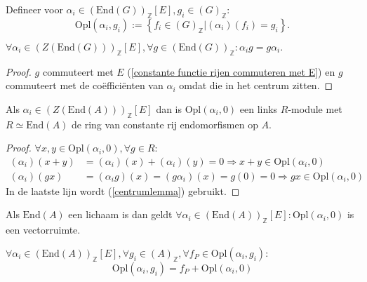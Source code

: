 \documentclass[a4paper,12pt]{article}
\begin{document}
\begin{definition} 
    Defineer voor $\alpha_i \in (\text{End}(G))_\mathbb{Z}[E], g_i \in (G)_{\mathbb{Z}}:$
    $$
        \text{Opl}(\alpha_i, g_i)  := \left\{f_i \in (G)_{\mathbb{Z}} | (\alpha_i)(f_i)=g_i \right\}.
    $$
\end{definition}

\begin{lemma}
    \label{centrumlemma}
    $\forall \alpha_i \in (Z(\text{End}(G)))_\mathbb{Z}[E], \forall g \in (\text{End}(G))_\mathbb{Z}: \alpha_ig = g\alpha_i.$
\end{lemma}

\begin{proof}
    $g$ commuteert met $E$ (\ref{constante functie rijen commuteren met E}) en $g$ commuteert met de coëfficiënten van
    $\alpha_i$ omdat die in het centrum zitten.
\end{proof}

\begin{theorem}
    Als $ \alpha_i \in (Z(\text{End}(A)))_\mathbb{Z}[E]$ dan is $\text{Opl}(\alpha_i,0)$ een links $R$-module
    met $R \simeq \text{End}(A)$ de ring van constante rij endomorfismen op $A$.
\end{theorem}

\begin{proof}
    $\forall x,y \in \text{Opl}(\alpha_i,0), \forall g \in R:$
    \begin{align*}
        (\alpha_i)(x+y) & = (\alpha_i)(x) + (\alpha_i)(y) = 0 \Rightarrow x+y \in \text{Opl}(\alpha_i,0)       \\
        (\alpha_i)(gx)  & = (\alpha_ig)(x) = (g\alpha_i)(x) = g(0)=0 \Rightarrow gx \in \text{Opl}(\alpha_i,0)
    \end{align*}
    In de laatste lijn wordt (\ref{centrumlemma}) gebruikt.
\end{proof}

\begin{corollary}
    Als $\text{End}(A)$ een lichaam is dan geldt $\forall \alpha_i \in
        (\text{End}(A))_\mathbb{Z}[E]:\text{Opl}(\alpha_i,0)$ is een vectorruimte.
\end{corollary}

\begin{theorem}
    $\forall \alpha_i \in (\text{End}(A))_\mathbb{Z}[E], \forall g_i \in (A)_{\mathbb{Z}}, \forall f_P \in
        \text{Opl}(\alpha_i,g_i):$
    $$
        \text{Opl}(\alpha_i,g_i) = f_P + \text{Opl}(\alpha_i,0)
    $$
\end{theorem}
\end{document}
